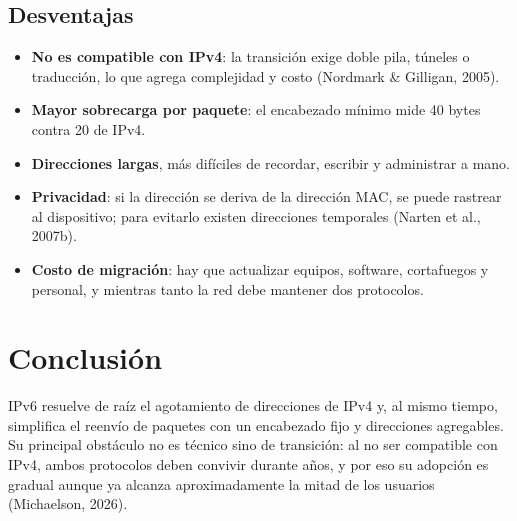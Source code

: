 \documentclass[12pt,letterpaper]{article}
\begin{document}
\subsection{Desventajas}
\begin{itemize}
\item \textbf{No es compatible con IPv4}: la transición exige doble pila, túneles o traducción, lo que agrega complejidad y costo (Nordmark \& Gilligan, 2005).
\item \textbf{Mayor sobrecarga por paquete}: el encabezado mínimo mide 40 bytes contra 20 de IPv4.
\item \textbf{Direcciones largas}, más difíciles de recordar, escribir y administrar a mano.
\item \textbf{Privacidad}: si la dirección se deriva de la dirección MAC, se puede rastrear al dispositivo; para evitarlo existen direcciones temporales (Narten et al., 2007b).
\item \textbf{Costo de migración}: hay que actualizar equipos, software, cortafuegos y personal, y mientras tanto la red debe mantener dos protocolos.
\end{itemize}

\section{Conclusión}
IPv6 resuelve de raíz el agotamiento de direcciones de IPv4 y, al mismo tiempo, simplifica el reenvío de paquetes con un encabezado fijo y direcciones agregables. Su principal obstáculo no es técnico sino de transición: al no ser compatible con IPv4, ambos protocolos deben convivir durante años, y por eso su adopción es gradual aunque ya alcanza aproximadamente la mitad de los usuarios (Michaelson, 2026).

\newpage
\end{document}
